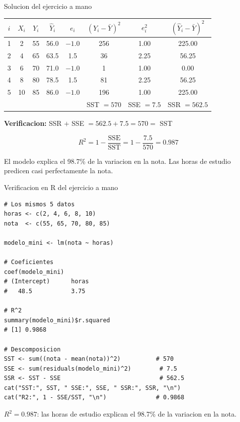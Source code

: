 \documentclass[aspectratio=169, 11pt]{beamer}
\begin{document}
\begin{frame}{Solucion del ejercicio a mano}
\small
\begin{center}
\begin{tabular}{cccccccc}
\toprule
$i$ & $X_i$ & $Y_i$ & $\hat{Y}_i$ & $e_i$ & $(Y_i - \bar{Y})^2$ & $e_i^2$ & $(\hat{Y}_i - \bar{Y})^2$ \\
\midrule
1 & 2 & 55 & 56.0 & $-1.0$ & 256 & 1.00 & 225.00 \\
2 & 4 & 65 & 63.5 & 1.5 & 36 & 2.25 & 56.25 \\
3 & 6 & 70 & 71.0 & $-1.0$ & 1 & 1.00 & 0.00 \\
4 & 8 & 80 & 78.5 & 1.5 & 81 & 2.25 & 56.25 \\
5 & 10 & 85 & 86.0 & $-1.0$ & 196 & 1.00 & 225.00 \\
\midrule
& & & & & SST $= 570$ & SSE $= 7.5$ & SSR $= 562.5$ \\
\bottomrule
\end{tabular}
\end{center}

\vspace{0.2cm}
\textbf{Verificacion:} SSR $+$ SSE $= 562.5 + 7.5 = 570 = $ SST \checkmark

\[
\boxed{R^2 = 1 - \frac{\text{SSE}}{\text{SST}} = 1 - \frac{7.5}{570} = 0.987}
\]

El modelo explica el 98.7\% de la variacion en la nota. Las horas de estudio predicen casi perfectamente la nota.
\end{frame}

\begin{frame}[fragile]{Verificacion en R del ejercicio a mano}
\begin{lstlisting}[basicstyle=\ttfamily\scriptsize]
# Los mismos 5 datos
horas <- c(2, 4, 6, 8, 10)
nota  <- c(55, 65, 70, 80, 85)

modelo_mini <- lm(nota ~ horas)

# Coeficientes
coef(modelo_mini)
# (Intercept)      horas
#   48.5           3.75

# R^2
summary(modelo_mini)$r.squared
# [1] 0.9868

# Descomposicion
SST <- sum((nota - mean(nota))^2)          # 570
SSE <- sum(residuals(modelo_mini)^2)        # 7.5
SSR <- SST - SSE                            # 562.5
cat("SST:", SST, " SSE:", SSE, " SSR:", SSR, "\n")
cat("R2:", 1 - SSE/SST, "\n")              # 0.9868
\end{lstlisting}

\vspace{0.1cm}
\small $R^2 = 0.987$: las horas de estudio explican el 98.7\% de la variacion en la nota.
\end{frame}
\end{document}
